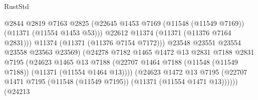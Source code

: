 \begin{lexlean}{RustStd}
\begin{coremodule}
                                              @2844
                                              @2819
                                              @7163
                                              @2825
                                              (@22645
                                                @1453
                                                @7169
                                                (@11548 (@11549 @7169))
                                                (@11371 (@11554 @1453 @53)))
                                              @22612
                                              @11374
                                              (@11371 (@11376 @7164 @2831)))
                                            @11374
                                            (@11371 (@11376 @7154 @7172)))
                                          @23548
                                          @23551
                                          @23554
                                          @23558
                                          @23563
                                          @23569)
                                        (@24278
                                          @7182
                                          @1465
                                          @1472
                                          @13
                                          @2831
                                          @7188
                                          @2831
                                          @7195
                                          (@24623
                                            @1465
                                            @13
                                            @7188
                                            (@22707
                                              @1464
                                              @7188
                                              (@11548 (@11549 @7188))
                                              (@11371 (@11554 @1464 @13))))
                                          (@24623
                                            @1472
                                            @13
                                            @7195
                                            (@22707
                                              @1471
                                              @7195
                                              (@11548 (@11549 @7195))
                                              (@11371 (@11554 @1471 @13))))))
                                      (@24213

\end{coremodule}
\end{lexlean}
